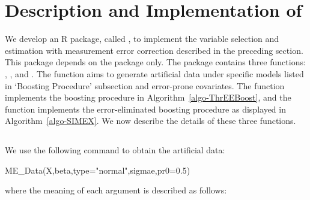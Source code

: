 \section{Description and Implementation of } \label{Sec-package}


We develop an R package, called , to implement the variable selection and estimation with measurement error correction described in the preceding section. This package {depends on the  package only}. The package   contains three functions: , , and . The function  aims to generate artificial data under specific models listed in `Boosting Procedure' subsection and error-prone covariates. The function  implements the boosting procedure in Algorithm~\ref{algo-ThrEEBoost}, and the function  implements the error-eliminated boosting procedure as displayed in Algorithm~\ref{algo-SIMEX}. We now describe the details of these three functions.


\subsection*{}

We use the following command to obtain the artificial data:

\begin{example}
                    ME_Data(X,beta,type="normal",sigmae,pr0=0.5)
\end{example}
where the meaning of each argument is described as follows:

